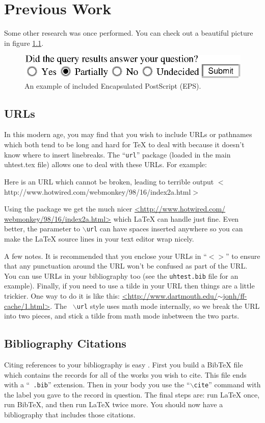 \chapter{Previous Work}

Some other research was once performed. You can check out a beautiful picture
in figure \ref{fig:example-1}.

\begin{figure}[htbp]
  \centering
  \includegraphics{example-figure.eps}
  \caption{An example of included Encapsulated PostScript (EPS).}
  \label{fig:example-1}
\end{figure}

\section{URLs}
In this modern age, you may find that you wish to include URLs or pathnames
which both tend to be long and hard for TeX to deal with because it doesn't
know where to insert linebreaks. The ``{\tt url}'' package (loaded in the main
uhtest.tex file) allows one to deal with these URLs. For example:

Here is an URL which cannot be broken, leading to terrible output
$<$http://www.hotwired.com/webmonkey/98/16/index2a.html$>$

Using the package we get the much nicer \url{<http://www.hotwired.com/
webmonkey/98/16/index2a.html>} which LaTeX can handle just fine. Even better,
the parameter to {\tt $\backslash$url} can have spaces inserted anywhere so you
can make the LaTeX source lines in your text editor wrap nicely.

A few notes. It is recommended that you enclose your URLs in ``$<>$'' to ensure
that any punctuation around the URL won't be confused as part of the URL. You
can use URLs in your bibliography too (see the {\tt uhtest.bib} file for an
example). Finally, if you need to use a tilde in your URL then things are a
little trickier. One way to do it is like this:
\url{<http://www.dartmouth.edu/}$\sim$\url{jonh/ff-cache/1.html>}. The {\tt
$\backslash$url} style uses math mode internally, so we break the URL into two
pieces, and stick a tilde from math mode inbetween the two parts.

\section{Bibliography Citations}
Citing references to your bibliography is easy \cite{lamport:latex}
\cite{patashnik:bibtex}. First you build a BibTeX file which contains the
records for all of the works you wish to cite. This file ends with a ``{\tt
.bib}'' extension. Then in your body you use the ``{\tt $\backslash$cite}''
command with the label you gave to the record in question. The final steps are: 
run LaTeX once, run BibTeX, and then run LaTeX twice more. You should now have
a bibliography that includes those citations.

